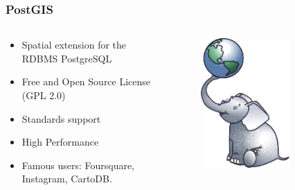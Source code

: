 \documentclass[hyperref={pdfpagelabels=true}]{beamer}
\begin{document}
\begin{frame}
\frametitle{PostGIS}
\begin{columns}
  \begin{column}{0.5\textwidth}
    \begin{itemize}
      \item<1->Spatial extension for the RDBMS PostgreSQL
      \item<1->Free and Open Source License (GPL 2.0)
      \item<2->Standards support%
      \item<3->High Performance%
      \item<4->Famous users: Foursquare, Instagram, CartoDB.       
    \end{itemize}    
  \end{column}
  \begin{column}{0.5\textwidth}
      \begin{figure}  
	\includegraphics[width=0.7\textwidth]{postgis.png}
       \end{figure}  
  \end{column}  
\end{columns}

\end{frame}
\end{document}
